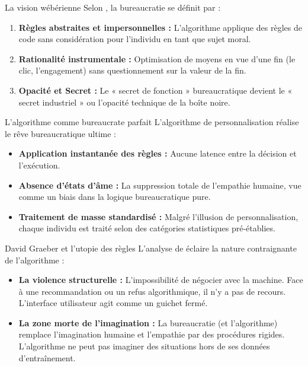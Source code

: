 \documentclass[9pt, aspectratio=169]{beamer}
\begin{document}
\begin{frame}{La vision wébérienne}
    Selon \cite{Weber2019}, la bureaucratie se définit par :
    \begin{enumerate}
        \item \textbf{Règles abstraites et impersonnelles :} L'algorithme applique des règles de code sans considération pour l'individu en tant que sujet moral.
        \item \textbf{Rationalité instrumentale :} Optimisation de moyens en vue d'une fin (le clic, l'engagement) sans questionnement sur la valeur de la fin.
        \item \textbf{Opacité et Secret :} Le « secret de fonction » bureaucratique devient le « secret industriel » ou l'opacité technique de la boîte noire.
    \end{enumerate}
\end{frame}

\begin{frame}{L'algorithme comme bureaucrate parfait}
    L'algorithme de personnalisation réalise le rêve bureaucratique ultime :
    \vspace{0.5cm}
    \begin{itemize}
        \item \textbf{Application instantanée des règles :} Aucune latence entre la décision et l'exécution.
        \item \textbf{Absence d'états d'âme :} La suppression totale de l'empathie humaine, vue comme un biais dans la logique bureaucratique pure.
        \item \textbf{Traitement de masse standardisé :} Malgré l'illusion de personnalisation, chaque individu est traité selon des catégories statistiques pré-établies.
    \end{itemize}
\end{frame}

\begin{frame}{David Graeber et l'utopie des règles}
    L'analyse de \cite{Graeber2015} éclaire la nature contraignante de l'algorithme :
    \begin{itemize}
        \item \textbf{La violence structurelle :} L'impossibilité de négocier avec la machine. Face à une recommandation ou un refus algorithmique, il n'y a pas de recours. L'interface utilisateur agit comme un guichet fermé.
        \item \textbf{La zone morte de l'imagination :} La bureaucratie (et l'algorithme) remplace l'imagination humaine et l'empathie par des procédures rigides. L'algorithme ne peut pas imaginer des situations hors de ses données d'entraînement.
    \end{itemize}
\end{frame}
\end{document}
